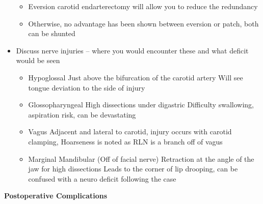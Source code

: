 \documentclass[
]{book}
\begin{document}
\begin{itemize}
  \begin{itemize}
  \item
    Eversion carotid endarterectomy will allow you to reduce the
    redundancy
  \item
    Otherwise, no advantage has been shown between eversion or
    patch, both can be shunted
  \end{itemize}
\item
  Discuss nerve injuries -- where you would encounter these and what
  deficit would be seen

  \begin{itemize}
  \item
    Hypoglossal Just above the bifurcation of the carotid artery
    Will see tongue deviation to the side of injury
  \item
    Glossopharyngeal High dissections under digastric Difficulty
    swallowing, aspiration risk, can be devastating
  \item
    Vagus Adjacent and lateral to carotid, injury occurs with
    carotid clamping, Hoarseness is noted as RLN is a branch off of
    vagus
  \item
    Marginal Mandibular (Off of facial nerve) Retraction at the
    angle of the jaw for high dissections Leads to the corner of lip
    drooping, can be confused with a neuro deficit following the
    case
  \end{itemize}
\end{itemize}

\textbf{Postoperative Complications}
\end{document}
